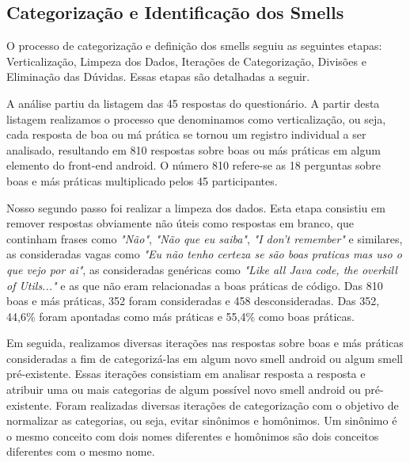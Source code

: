 
\subsection{Categoriza\c{c}\~ao e Identifica\c{c}\~ao dos Smells}
\label{sub:smells-definition}

O processo de categoriza\c{c}\~ao e defini\c{c}\~ao dos smells seguiu as seguintes etapas: Verticaliza\c{c}\~ao, Limpeza dos Dados, Itera\c{c}\~oes de Categoriza\c{c}\~ao, Divis\~oes e Elimina\c{c}\~ao das D\'uvidas. Essas etapas s\~ao detalhadas a seguir.

A an\'alise partiu da listagem das 45 respostas do question\'ario. A partir desta listagem realizamos o processo que denominamos como verticaliza\c{c}\~ao, ou seja, cada resposta de boa ou m\'a pr\'atica se tornou um registro individual a ser analisado, resultando em 810 respostas sobre boas ou m\'as pr\'aticas em algum elemento do front-end android. O n\'umero 810 refere-se as 18 perguntas sobre boas e m\'as pr\'aticas multiplicado pelos 45 participantes.

Nosso segundo passo foi realizar a limpeza dos dados. Esta etapa consistiu em remover respostas obviamente n\~ao \'uteis como respostas em branco, que continham frases como \textit{"N\~ao"}, \textit{"N\~ao que eu saiba"}, \textit{"I don't remember"} e similares, as consideradas vagas como \textit{"Eu n\~ao tenho certeza se s\~ao boas praticas mas uso o que vejo por ai"}, as consideradas gen\'ericas como \textit{"Like all Java code, the overkill of Utils..."} e as que n\~ao eram relacionadas a boas pr\'aticas de c\'odigo. Das 810 boas e m\'as pr\'aticas, 352 foram consideradas e 458 desconsideradas. Das 352, 44,6\% foram apontadas como m\'as pr\'aticas e 55,4\% como boas pr\'aticas. 

Em seguida, realizamos diversas itera\c{c}\~oes nas respostas sobre boas e m\'as pr\'aticas consideradas a fim de categoriz\'a-las em algum novo smell android ou algum smell pr\'e-existente. Essas itera\c{c}\~oes consistiam em analisar resposta a resposta e atribuir uma ou mais categorias de algum poss\'ivel novo smell android ou pr\'e-existente. Foram realizadas diversas itera\c{c}\~oes de categoriza\c{c}\~ao com o objetivo de normalizar as categorias, ou seja, evitar sin\^onimos e hom\^onimos. Um sin\^onimo \'e o mesmo conceito com dois nomes diferentes e hom\^onimos s\~ao dois conceitos diferentes com o mesmo nome. 

